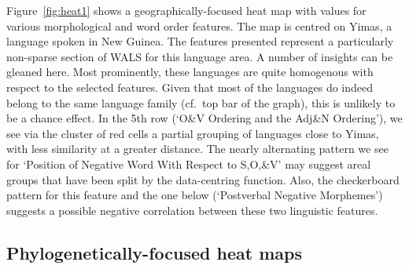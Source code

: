 \documentclass[11pt]{article}
\begin{document}
Figure~\ref{fig:heat1} shows a geographically-focused heat map with values for various morphological and word order features. The map is centred on Yimas, a language spoken in New Guinea. The features presented represent a particularly non-sparse section of WALS for this language area. A number of insights can be gleaned here. Most prominently, these languages are quite homogenous with respect to the selected features. Given that most of the languages do indeed belong to the same language family (cf.\ top bar of the graph), this is unlikely to be a chance effect.  In the 5th row (`O\&V Ordering and the Adj\&N Ordering'), we see via the cluster of red cells a partial grouping of languages close to Yimas, with less similarity at a greater distance. The nearly alternating pattern we see for `Position of Negative Word With Respect to S,O,\&V' may suggest areal groups that have been split by the data-centring function. Also, the checkerboard pattern for this feature and the one below (`Postverbal Negative Morphemes') suggests a possible negative correlation between these two linguistic features.



\subsection{Phylogenetically-focused heat maps}
\end{document}
